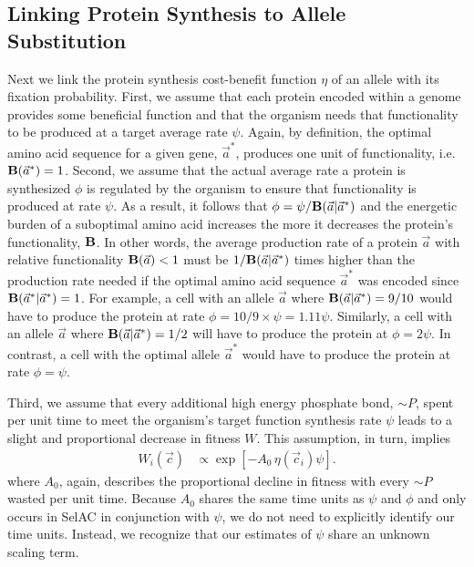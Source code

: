 \documentclass[onecolumn,letterpaper,fleqn,nogrid]{myMBE}%
\newcommand{\Funcaoptvec}{\ensuremath{\Func(\aoptvec|\aoptvec)}\xspace}
\newcommand{\Funcavec}{\ensuremath{\Func(\avec|\aoptvec)}\xspace}
\newcommand{\Func}{\ensuremath{\text{\textbf{B}}}\xspace}
\newcommand{\simP}{\ensuremath{\sim P}\xspace}
\newcommand{\selac}{SelAC\xspace}
\newcommand{\aoptvec}{\ensuremath{\Vec{a}^*}\xspace}
\newcommand{\avec}{\ensuremath{\Vec{a}}\xspace}
\newcommand{\cveci}{\ensuremath{\cvec_i}\xspace}
\newcommand{\cvec}{\ensuremath{\Vec{c}}\xspace}
\begin{document}
\subsection{Linking Protein Synthesis to Allele Substitution}
Next we link the protein synthesis cost-benefit function $\eta$ of an allele with its fixation probability.
First, we assume that each protein encoded within a genome provides some beneficial function and that the organism needs that functionality to be produced at a target average rate $\psi$.
Again, by definition, the optimal amino acid sequence for a given gene, \aoptvec, produces one unit of functionality, i.e.~$\Func(\aoptvec) = 1$.
Second, we assume that the actual average rate a protein is synthesized $\phi$ is regulated by the organism to ensure that functionality is produced at rate $\psi$.
As a result, it follows that $\phi = \psi/\Funcavec$ and the energetic burden of a suboptimal amino acid increases the more it decreases the protein's functionality, \Func.
In other words, the average production rate of a protein \avec with relative functionality $\Func(\avec) < 1$ must be $1/\Funcavec$ times higher than the production rate needed if the optimal amino acid sequence \aoptvec was encoded since $\Funcaoptvec = 1$.
For example, a cell with an allele \avec where $\Funcavec = 9/10$ would have to produce the protein at rate $\phi = 10/9 \times \psi = 1.11 \psi$.
Similarly, a cell with an allele \avec where $\Funcavec = 1/2$ will have to produce the protein at $\phi = 2 \psi$.
In contrast, a cell with the optimal allele \aoptvec would have to produce the protein at rate $\phi = \psi$.



Third, we assume that every additional high energy phosphate bond, \simP, spent per unit time to meet the organism's target function synthesis rate $\psi$ leads to a slight and proportional decrease in fitness $W$.
This assumption, in turn, implies
\begin{align*}
  W_i\left(\cvec\right) &\propto \exp\left[- A_0 \, \eta(\cveci) \psi\right].
\end{align*}
where $A_0$, again, describes the proportional decline in fitness with every \simP wasted per unit time.
Because $A_0$ shares the same time units as $\psi$ and $\phi$ and only occurs in \selac in conjunction with $\psi$, we do not need to explicitly identify our time units.
Instead, we recognize that our estimates of $\psi$ share an unknown scaling term.
\end{document}
